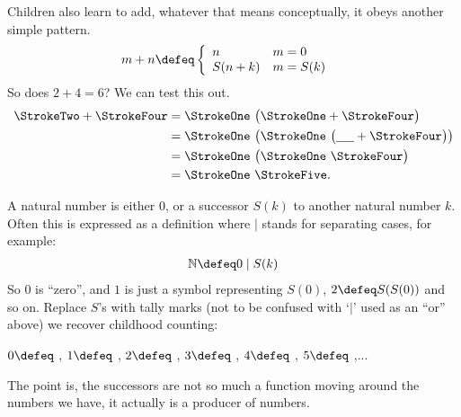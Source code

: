 Children also learn to add, whatever that means conceptually, it obeys 
another simple pattern.
\begin{align*}
    m+n & \defeq\left\{ 
    \begin{array}{ll}
        n & m = 0\\
        S(n+k) & m=S(k)
    \end{array}
    \right.
\end{align*}
So does $2+4=6$?  We can test this out.
\begin{align*}
    \text{\StrokeTwo}+\text{\StrokeFour} & = \text{\StrokeOne}~ \big(\text{\StrokeOne} +\text{\StrokeFour}\big)\\
    & = \text{\StrokeOne}~ \big( \text{\StrokeOne}~\big(\underline{\hspace{5mm}}+\StrokeFour\big)\big)\\
    & = \text{\StrokeOne}~ \big( \text{\StrokeOne}~\StrokeFour\big)\\
    & = \text{\StrokeOne}~ \text{\StrokeFive}.
\end{align*}


A natural number is either $0$, or a successor 
$S(k)$ to 
another natural number $k$.  Often this is expressed as a 
definition where $\mid$ stands for separating cases, 
for example:
\begin{align*}
    \mathbb{N} \defeq 0 \mid S(k)
\end{align*}
So $0$ is ``zero'', and $1$ is just a symbol representing $S(0)$, 
$2\defeq S(S(0))$ and so on.  Replace $S$'s with tally marks (not to be 
confused with `$|$' used as an ``or'' above)
we recover childhood counting:
\begin{center}
    $0\defeq$ \underline{\hspace{5mm}}, 
    $1\defeq$ \StrokeOne,
    $2\defeq$ \StrokeTwo,
    $3\defeq$ \StrokeThree,
    $4\defeq$ \StrokeFour,
    $5\defeq$ \StrokeFive,...
\end{center}
The point is, the successors are not so much a function 
moving around the numbers we have, it actually is a producer 
of numbers. 
